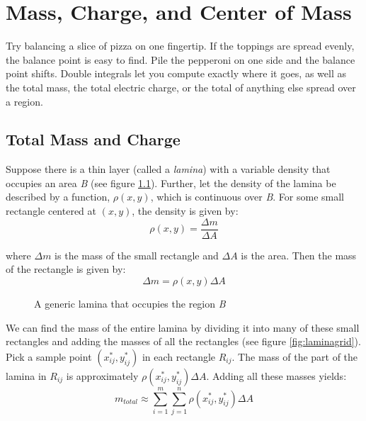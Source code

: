 \chapter{Mass, Charge, and Center of Mass}

Try balancing a slice of pizza on one fingertip. If the toppings are spread
evenly, the balance point is easy to find. Pile the pepperoni on one side and
the balance point shifts. Double integrals let you compute exactly where it
goes, as well as the total mass, the total electric charge, or the total of
anything else spread over a region.

\section{Total Mass and Charge}
Suppose there is a thin layer (called a \textit{lamina}) with a 
variable density that occupies an area \textit{B} (see figure \ref{fig:lamina}).
Further, let the density of the lamina be described by a function, $\rho 
(x, y)$, which is continuous over \textit{B}. For some small rectangle centered
at $(x, y)$, the density is given by:
$$\rho (x, y) = \frac{\Delta m}{\Delta A}$$

where $\Delta m$ is the mass of the small rectangle and $\Delta A$ is the area.
Then the mass of the rectangle is given by:
$$\Delta m = \rho (x, y) \Delta A$$

\begin{figure}[H]
\centering
    \caption{A generic lamina that occupies the region \textit{B}}
    \label{fig:lamina}
\end{figure}

We can find the mass of the entire lamina by dividing it into many of these 
small rectangles and adding the masses of all the rectangles (see figure
\ref{fig:laminagrid}). Pick a sample point
$(x_{ij}^*, y_{ij}^*)$ in each rectangle $R_{ij}$. The mass of the 
part of the lamina in $R_{ij}$ is approximately $\rho (x_{ij}^*, y_{ij}^*) \Delta 
A$. Adding all these masses yields:
$$m_{total} \approx \sum_{i = 1}^m \sum_{j = 1}^n \rho (x_{ij}^*, y_{ij}^*) 
\Delta A$$

